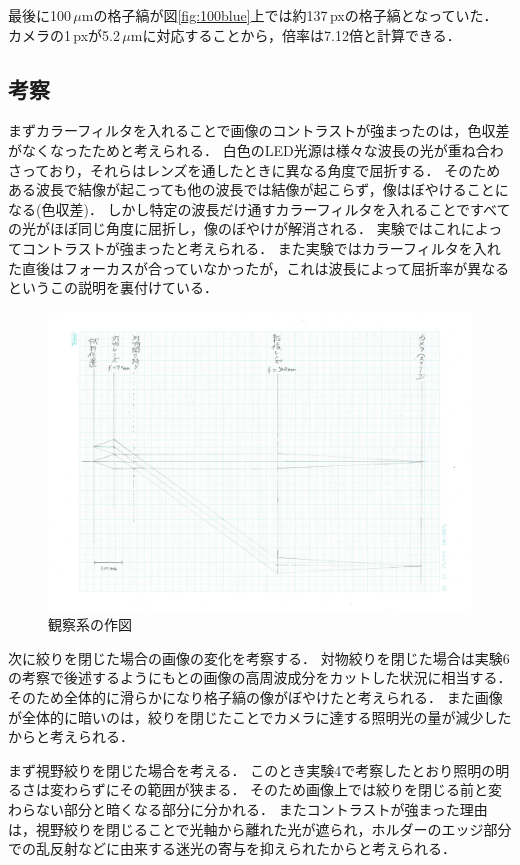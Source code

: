 \documentclass[titlepage]{jsarticle}
\begin{document}
最後に100\,$\mu$mの格子縞が図\ref{fig:100blue}上では約137\,pxの格子縞となっていた．
カメラの1\,pxが5.2\,$\mu$mに対応することから，倍率は7.12倍と計算できる．

\subsection{考察}
まずカラーフィルタを入れることで画像のコントラストが強まったのは，色収差がなくなったためと考えられる．
白色のLED光源は様々な波長の光が重ね合わさっており，それらはレンズを通したときに異なる角度で屈折する．
そのためある波長で結像が起こっても他の波長では結像が起こらず，像はぼやけることになる(色収差)．
しかし特定の波長だけ通すカラーフィルタを入れることですべての光がほぼ同じ角度に屈折し，像のぼやけが解消される．
実験ではこれによってコントラストが強まったと考えられる．
また実験ではカラーフィルタを入れた直後はフォーカスが合っていなかったが，これは波長によって屈折率が異なるというこの説明を裏付けている．

\begin{figure}[htbp]
  \centering
  \includegraphics[width=15cm]{obj_fig.jpg}
  \caption{観察系の作図}
  \label{fig:obj_fig}
\end{figure}

次に絞りを閉じた場合の画像の変化を考察する．
対物絞りを閉じた場合は実験6の考察で後述するようにもとの画像の高周波成分をカットした状況に相当する．
そのため全体的に滑らかになり格子縞の像がぼやけたと考えられる．
また画像が全体的に暗いのは，絞りを閉じたことでカメラに達する照明光の量が減少したからと考えられる．

まず視野絞りを閉じた場合を考える．
このとき実験4で考察したとおり照明の明るさは変わらずにその範囲が狭まる．
そのため画像上では絞りを閉じる前と変わらない部分と暗くなる部分に分かれる．
またコントラストが強まった理由は，視野絞りを閉じることで光軸から離れた光が遮られ，ホルダーのエッジ部分での乱反射などに由来する迷光の寄与を抑えられたからと考えられる．
\end{document}
